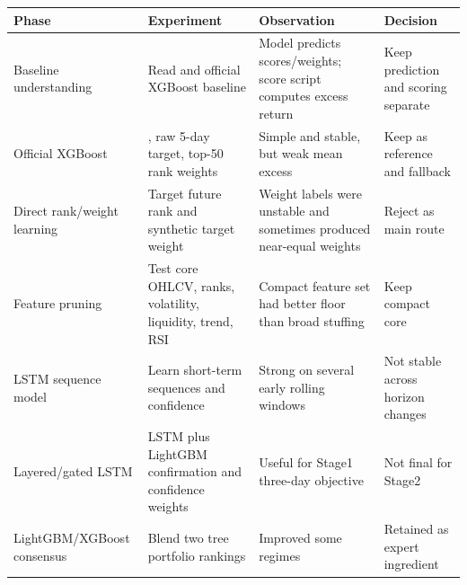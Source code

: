 \documentclass[11pt]{article}
\newcommand{\code}[1]{{\ttfamily\footnotesize\seqsplit{#1}}}
\begin{document}
\begin{longtable}[]{@{}|
  >{\RaggedRight\arraybackslash}m{}|
  >{\RaggedRight\arraybackslash}m{}|
  >{\RaggedRight\arraybackslash}m{}|
  >{\RaggedRight\arraybackslash}m{}|@{}}
\hline\rowcolor{tableHead}
\begin{minipage}[c]{\linewidth}\centering\bfseries
Phase
\end{minipage} & \begin{minipage}[c]{\linewidth}\centering\bfseries
Experiment
\end{minipage} & \begin{minipage}[c]{\linewidth}\centering\bfseries
Observation
\end{minipage} & \begin{minipage}[c]{\linewidth}\centering\bfseries
Decision
\end{minipage} \\
\hline
\endhead
\hline
\endlastfoot
Baseline understanding & Read \code{score\_submission.py} and official
XGBoost baseline & Model predicts scores/weights; score script computes
excess return & Keep prediction and scoring separate \\
\hline
Official XGBoost & \code{baseline\_xgboost.py}, raw 5-day target,
top-50 rank weights & Simple and stable, but weak mean excess & Keep as
reference and fallback \\
\hline
Direct rank/weight learning & Target future rank and synthetic target
weight & Weight labels were unstable and sometimes produced near-equal
weights & Reject as main route \\
\hline
Feature pruning & Test core OHLCV, ranks, volatility, liquidity, trend,
RSI & Compact feature set had better floor than broad stuffing & Keep
compact core \\
\hline
LSTM sequence model & Learn short-term sequences and confidence & Strong
on several early rolling windows & Not stable across horizon changes \\
\hline
Layered/gated LSTM & LSTM plus LightGBM confirmation and confidence
weights & Useful for Stage1 three-day objective & Not final for
Stage2 \\
\hline
LightGBM/XGBoost consensus & Blend two tree portfolio rankings &
Improved some regimes & Retained as expert ingredient \\

\end{longtable}
\end{document}
